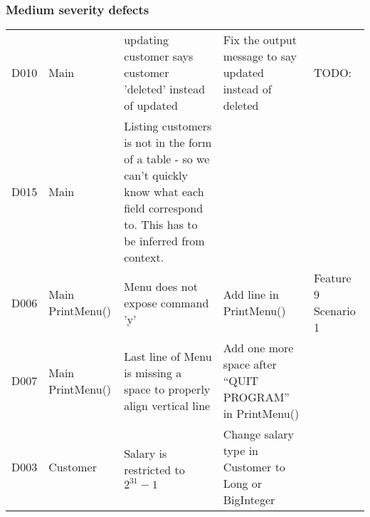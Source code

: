 \subsubsection{Medium severity defects}
\begin{table}[H]
\renewcommand{\thefootnote}{\roman{footnote}} 
\footnotesize 
\begin{minipage}{\textwidth}

\begin{tabularx}{\textwidth}{| c | P | X | X | P |}
\hline %
 &  &  &  &  \\
\hline %
D010 
& Main 
& updating customer says customer 'deleted' instead of updated 
& Fix the output message to say updated instead of deleted 
& TODO: \\
\hline %
D015 
& Main 
& Listing customers is not in the form of a table - so we can't quickly know what each field correspond to. This has to be inferred from context.  
&  
& \\
\hline %
D006 
& Main \linebreak PrintMenu()
& Menu does not expose command ’y’ 
& Add line in PrintMenu() 
& Feature 9 Scenario 1 \\ %
\hline %
D007 
& Main \linebreak PrintMenu()
& Last line of Menu is missing a space to properly align vertical line 
& Add one more space after “QUIT PROGRAM” in PrintMenu() 
& \\
\hline %
D003 
& Customer
& Salary is restricted to $2^{31}−1$
& Change salary type in Customer to Long or BigInteger 
& \\
\hline %

\end{tabularx}
\end{minipage}
\end{table}
